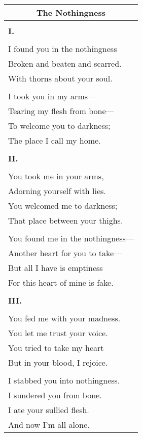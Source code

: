 \documentclass{article}
\begin{document}
\newcommand{\h}{\hspace*{2ex}}
\newcommand{\hh}{\hspace*{4ex}}
\newcommand{\hhh}{\hspace*{6ex}}

\begin{center}
\begin{tabular}{l}
\multicolumn{1}{c}{\textbf{The Nothingness}} \\\hline
\\
\textbf{I.} \\
\\
I found you in the nothingness \\
\h{}Broken and beaten and scarred. \\
\hh{}With thorns about your soul. \\
\\
I took you in my arms--- \\
\h{}Tearing my flesh from bone--- \\
\hh{}To welcome you to darkness; \\
\hhh{}The place I call my home. \\
\\
\textbf{II.} \\
\\
You took me in your arms, \\
\h{}Adorning yourself with lies. \\
\hh{}You welcomed me to darkness; \\
\hhh{}That place between your thighs. \\
\\
You found me in the nothingness--- \\
\h{}Another heart for you to take--- \\
\hh{}But all I have is emptiness \\
\hhh{}For this heart of mine is fake. \\
\\
\textbf{III.} \\
\\
You fed me with your madness. \\
\h{}You let me trust your voice. \\
\hh{}You tried to take my heart \\
\hhh{}But in your blood, I rejoice. \\
\\
I stabbed you into nothingness. \\
\h{}I sundered you from bone. \\
\hh{}I ate your sullied flesh. \\
\hhh{}And now I'm all alone. \\
\end{tabular}
\end{center}
\end{document}
